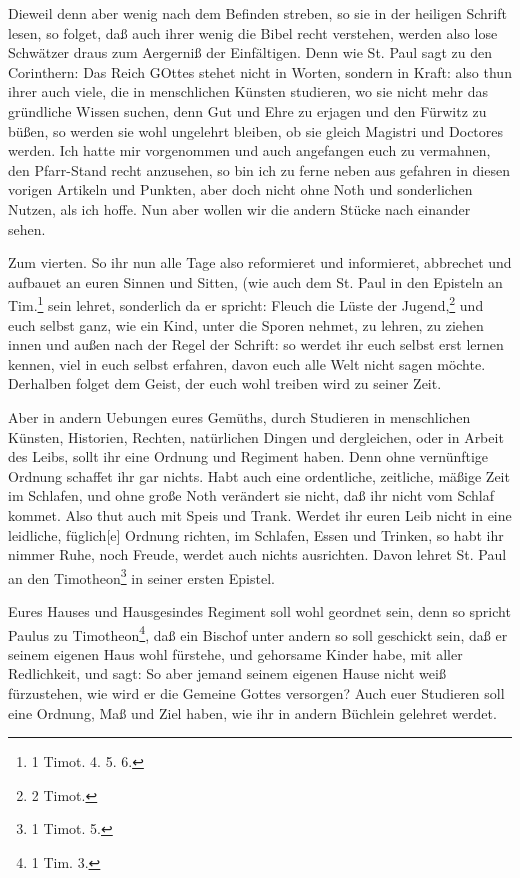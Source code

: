 Dieweil denn aber wenig nach dem Befinden streben, so sie in der heiligen Schrift lesen, so folget, daß auch ihrer wenig die Bibel recht verstehen, werden also lose Schwätzer draus zum Aergerniß der Einfältigen. Denn wie St. Paul sagt zu den Corinthern: Das Reich GOttes stehet nicht in Worten, sondern in Kraft: also thun ihrer auch viele, die in menschlichen Künsten studieren, wo sie nicht mehr das gründliche Wissen suchen, denn Gut und Ehre zu erjagen und den Fürwitz zu büßen, so werden sie wohl ungelehrt bleiben, ob sie gleich Magistri und Doctores werden. Ich hatte mir vorgenommen und auch angefangen euch zu vermahnen, den Pfarr-Stand recht anzusehen, so bin ich zu ferne neben aus gefahren in diesen vorigen Artikeln und Punkten, aber doch nicht ohne Noth und sonderlichen Nutzen, als ich hoffe. Nun aber wollen wir die andern Stücke nach einander sehen.

Zum vierten. So ihr nun alle Tage also reformieret und informieret, abbrechet und aufbauet an euren Sinnen und Sitten,
(wie auch dem St. Paul in den Episteln an Tim.\footnote{1 Timot. 4. 5. 6.} sein lehret, sonderlich da er spricht: Fleuch die Lüste der Jugend,\footnote{2 Timot.} und euch selbst ganz, wie ein Kind, unter die Sporen nehmet, zu lehren, zu ziehen innen und außen nach der Regel der Schrift: so werdet ihr euch selbst erst lernen kennen, viel in euch selbst erfahren, davon euch alle Welt nicht sagen möchte. Derhalben folget dem Geist, der euch wohl treiben wird zu seiner Zeit.

Aber in andern Uebungen eures Gemüths, durch Studieren in menschlichen Künsten, Historien, Rechten, natürlichen Dingen und dergleichen, oder in Arbeit des Leibs, sollt ihr eine Ordnung und Regiment haben. Denn ohne vernünftige Ordnung schaffet ihr gar nichts. Habt auch eine ordentliche, zeitliche, mäßige Zeit im Schlafen, und ohne große Noth verändert sie nicht, daß ihr nicht vom Schlaf kommet. Also thut auch mit Speis und Trank. Werdet ihr euren Leib nicht in eine leidliche, füglich[e] Ordnung richten, im Schlafen, Essen und Trinken, so habt ihr nimmer Ruhe, noch Freude, werdet auch nichts ausrichten. Davon lehret St. Paul an den Timotheon\footnote{1 Timot. 5.} in seiner ersten Epistel.

Eures Hauses und Hausgesindes Regiment soll wohl geordnet sein, denn so spricht Paulus zu Timotheon\footnote{1 Tim. 3.}, daß ein Bischof unter andern so soll geschickt sein, daß er seinem eigenen Haus wohl fürstehe, und gehorsame Kinder habe, mit aller Redlichkeit, und sagt: So aber jemand seinem eigenen Hause nicht weiß fürzustehen, wie wird er die Gemeine Gottes versorgen? Auch euer Studieren soll eine Ordnung, Maß und Ziel haben, wie ihr in andern Büchlein gelehret werdet.

